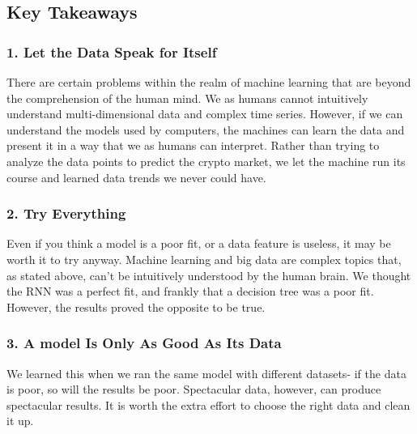 \documentclass{article}
\begin{document}
\subsection{ Key Takeaways }
\subsubsection{ 1. Let the Data Speak for Itself }
There are certain problems within the realm of machine learning that are beyond the comprehension of the human mind. We as humans cannot intuitively understand multi-dimensional data and complex time series. However, if we can understand the models used by computers, the machines can learn the data and present it in a way that we as humans can interpret. Rather than trying to analyze the data points to predict the crypto market, we let the machine run its course and learned data trends we never could have.
\subsubsection{ 2. Try Everything}
Even if you think a model is a poor fit, or a data feature is useless, it may be worth it to try anyway. Machine learning and big data are complex topics that, as stated above, can't be intuitively understood by the human brain. We thought the RNN was a perfect fit, and frankly that a decision tree was a poor fit. However, the results proved the opposite to be true.
\subsubsection{ 3. A model Is Only As Good As Its Data}
We learned this when we ran the same model with different datasets- if the data is poor, so will the results be poor. Spectacular data, however, can produce spectacular results. It is worth the extra effort to choose the right data and clean it up.
\end{document}
